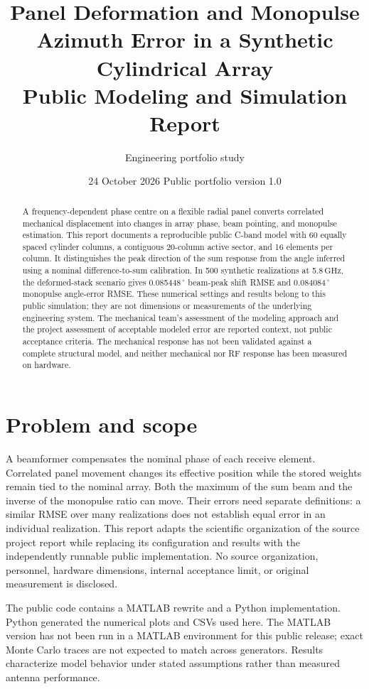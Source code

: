 \documentclass[11pt,a4paper]{report}
\title{Panel Deformation and Monopulse Azimuth Error in a Synthetic Cylindrical Array\\\large Public Modeling and Simulation Report}
\author{Engineering portfolio study}
\date{24 October 2026 \quad Public portfolio version 1.0}
\newcommand{\SI}[2]{#1\,\ensuremath{\mathrm{#2}}}
\newcommand{\giga}{G}
\newcommand{\hertz}{Hz}
\newcommand{\degree}{^\circ}
\begin{document}
\maketitle
\begin{abstract}
A frequency-dependent phase centre on a flexible radial panel converts correlated mechanical displacement into changes in array phase, beam pointing, and monopulse estimation. This report documents a reproducible public C-band model with 60 equally spaced cylinder columns, a contiguous 20-column active sector, and 16 elements per column. It distinguishes the peak direction of the sum response from the angle inferred using a nominal difference-to-sum calibration. In 500 synthetic realizations at \SI{5.8}{\giga\hertz}, the deformed-stack scenario gives \SI{0.085448}{\degree} beam-peak shift RMSE and \SI{0.084084}{\degree} monopulse angle-error RMSE. These numerical settings and results belong to this public simulation; they are not dimensions or measurements of the underlying engineering system. The mechanical team's assessment of the modeling approach and the project assessment of acceptable modeled error are reported context, not public acceptance criteria. The mechanical response has not been validated against a complete structural model, and neither mechanical nor RF response has been measured on hardware.
\end{abstract}
\tableofcontents
\chapter{Problem and scope}
A beamformer compensates the nominal phase of each receive element. Correlated panel movement changes its effective position while the stored weights remain tied to the nominal array. Both the maximum of the sum beam and the inverse of the monopulse ratio can move. Their errors need separate definitions: a similar RMSE over many realizations does not establish equal error in an individual realization. This report adapts the scientific organization of the source project report while replacing its configuration and results with the independently runnable public implementation. No source organization, personnel, hardware dimensions, internal acceptance limit, or original measurement is disclosed.

The public code contains a MATLAB rewrite and a Python implementation. Python generated the numerical plots and CSVs used here. The MATLAB version has not been run in a MATLAB environment for this public release; exact Monte Carlo traces are not expected to match across generators. Results characterize model behavior under stated assumptions rather than measured antenna performance.
\end{document}

